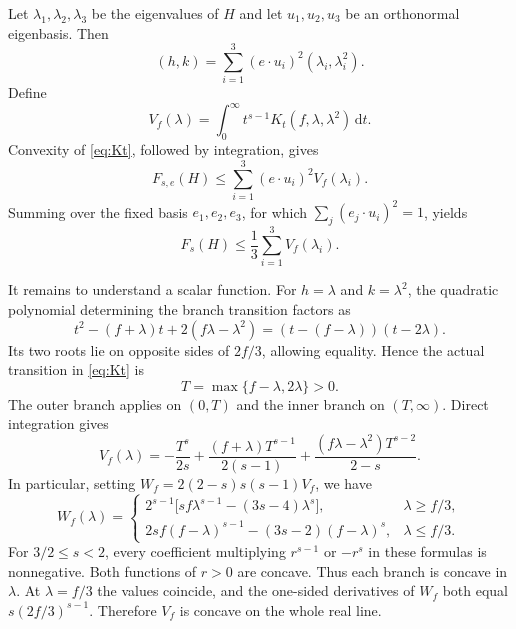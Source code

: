 \documentclass[11pt,a4paper,reqno]{amsart}
\theoremstyle{plain}
\theoremstyle{remark}
\numberwithin{equation}{section}
\newcommand{\dd}{\,\mathrm d}
\begin{document}
Let $\lambda_1,\lambda_2,\lambda_3$ be the eigenvalues of $H$ and let $u_1,u_2,u_3$ be an orthonormal eigenbasis. Then
\[
 (h,k)=\sum_{i=1}^3(e\cdot u_i)^2(\lambda_i,\lambda_i^2).
\]
Define
\[
 V_f(\lambda)=\int_0^\infty t^{s-1}K_t(f,\lambda,\lambda^2)\dd t.
\]
Convexity of \eqref{eq:Kt}, followed by integration, gives
\[
 F_{s,e}(H)\le\sum_{i=1}^3(e\cdot u_i)^2V_f(\lambda_i).
\]
Summing over the fixed basis $e_1,e_2,e_3$, for which $\sum_j(e_j\cdot u_i)^2=1$, yields
\begin{equation}\label{eq:spectral-bound}
 F_s(H)\le\frac13\sum_{i=1}^3V_f(\lambda_i).
\end{equation}

It remains to understand a scalar function. For $h=\lambda$ and $k=\lambda^2$, the quadratic polynomial determining the branch transition factors as
\[
 t^2-(f+\lambda)t+2(f\lambda-\lambda^2)
   =(t-(f-\lambda))(t-2\lambda).
\]
Its two roots lie on opposite sides of $2f/3$, allowing equality. Hence the actual transition in \eqref{eq:Kt} is
\[
 T=\max\{f-\lambda,2\lambda\}>0.
\]
The outer branch applies on $(0,T)$ and the inner branch on $(T,\infty)$. Direct integration gives
\begin{equation}\label{eq:vertex-integral}
 V_f(\lambda)=-\frac{T^s}{2s}
 +\frac{(f+\lambda)T^{s-1}}{2(s-1)}
 +\frac{(f\lambda-\lambda^2)T^{s-2}}{2-s}.
\end{equation}
In particular, setting $W_f=2(2-s)s(s-1)V_f$, we have
\begin{equation}\label{eq:vertex-concavity}
 W_f(\lambda)=
 \begin{cases}
  2^{s-1}\bigl[sf\lambda^{s-1}-(3s-4)\lambda^s\bigr],
       &\lambda\ge f/3,\\[3pt]
  2sf(f-\lambda)^{s-1}-(3s-2)(f-\lambda)^s,
       &\lambda\le f/3.
 \end{cases}
\end{equation}
For $3/2\le s<2$, every coefficient multiplying $r^{s-1}$ or $-r^s$ in these formulas is nonnegative. Both functions of $r>0$ are concave. Thus each branch is concave in $\lambda$. At $\lambda=f/3$ the values coincide, and the one-sided derivatives of $W_f$ both equal $s(2f/3)^{s-1}$. Therefore $V_f$ is concave on the whole real line.
\end{document}

